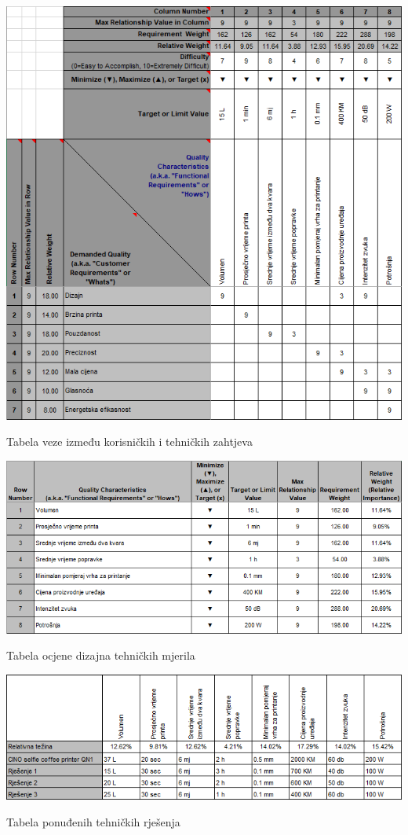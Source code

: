 \documentclass[12pt]{article}
\begin{document}
\begin{table}
\includegraphics[width=\textwidth]{tabela_sredina}
\caption{Tabela veze između korisničkih i tehničkih zahtjeva}
\end{table}

\begin{table}
\includegraphics[width=\textwidth]{tabela_zakljucak}
\caption{Tabela ocjene dizajna tehničkih mjerila}
\end{table}

\begin{table}
\includegraphics[width=\textwidth]{tabela_donja}
\caption{Tabela ponuđenih tehničkih rješenja}
\end{table}
\end{document}
